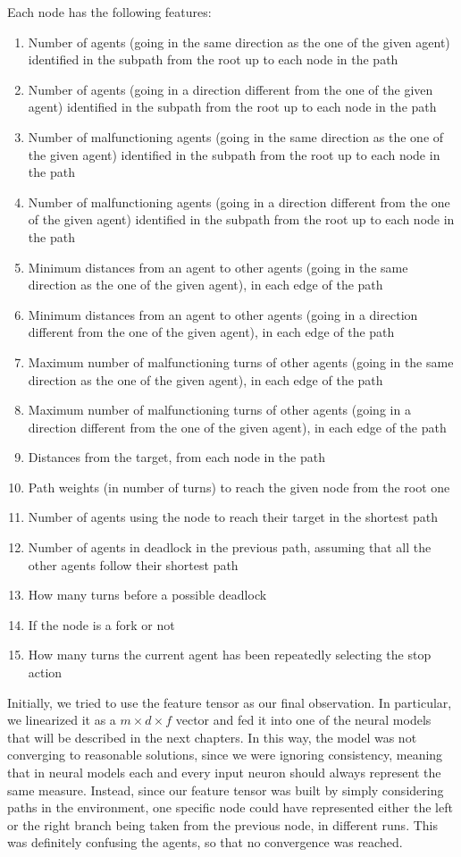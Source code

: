\documentclass[a4paper,10pt]{report}
\begin{document}
Each node has the following features:
\begin{enumerate}
	\item Number of agents (going in the same direction as the one of the given agent) identified in the subpath from the root up to each node in the path
	\item Number of agents (going in a direction different from the one of the given agent) identified in the subpath from the root up to each node in the path
 	\item Number of malfunctioning agents (going in the same direction as the one of the given agent) identified in the subpath from the root up to each node in the path
	\item Number of malfunctioning agents (going in a direction different from the one of the given agent) identified in the subpath from the root up to each node in the path
	\item Minimum distances from an agent to other agents (going in the same direction as the one of the given agent), in each edge of the path
	\item Minimum distances from an agent to other agents (going in a direction different from the one of the given agent), in each edge of the path
	\item Maximum number of malfunctioning turns of other agents (going in the same direction as the one of the given agent), in each edge of the path
	\item Maximum number of malfunctioning turns of other agents (going in a direction different from the one of the given agent), in each edge of the path
 	\item Distances from the target, from each node in the path
 	\item Path weights (in number of turns) to reach the given node from the root one
 	\item Number of agents using the node to reach their target in the shortest path
 	\item Number of agents in deadlock in the previous path, assuming that all the other agents follow their shortest path
 	\item How many turns before a possible deadlock
 	\item If the node is a fork or not
 	\item How many turns the current agent has been repeatedly selecting the stop action
\end{enumerate}

Initially, we tried to use the feature tensor as our final observation. In particular, we linearized it as a $m\times d \times f$ vector and fed it into one of the neural models that will be described in the next chapters. In this way, the model was not converging to reasonable solutions, since we were ignoring consistency, meaning that in neural models each and every input neuron should always represent the same measure. Instead, since our feature tensor was built by simply considering paths in the environment, one specific node could have represented either the left or the right branch being taken from the previous node, in different runs. This was definitely confusing the agents, so that no convergence was reached.
\end{document}
